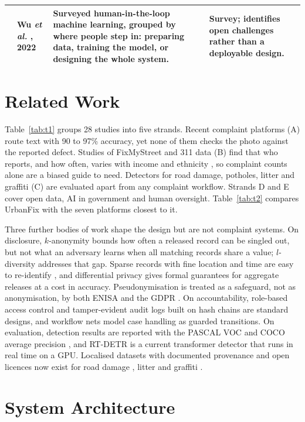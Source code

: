 \documentclass{ieeeaccess}
\begin{document}
\begin{table}[!t]
\begin{tabular}{@{}>{\centering\arraybackslash}p{}p{}p{}p{}@{}}
28 & Wu \textit{et al.} \cite{b39}, 2022 & Surveyed human-in-the-loop machine learning, grouped by where people step in: preparing data, training the model, or designing the whole system. & Survey; identifies open challenges rather than a deployable design.\\
\bottomrule
\end{tabular}
\end{table}

\section{Related Work}\label{sec:rw}

Table~\ref{tab:t1} groups 28 studies into five strands. Recent complaint platforms (A) route text with 90 to 97\% accuracy, yet none of them checks the photo against the reported defect. Studies of FixMyStreet and 311 data (B) find that who reports, and how often, varies with income and ethnicity \cite{b12,b13,b14}, so complaint counts alone are a biased guide to need. Detectors for road damage, potholes, litter and graffiti (C) are evaluated apart from any complaint workflow. Strands D and E cover open data, AI in government and human oversight. Table~\ref{tab:t2} compares UrbanFix with the seven platforms closest to it.

Three further bodies of work shape the design but are not complaint systems. On disclosure, $k$-anonymity \cite{b37} bounds how often a released record can be singled out, but not what an adversary learns when all matching records share a value; $l$-diversity \cite{b41} addresses that gap. Sparse records with fine location and time are easy to re-identify \cite{b43,b44,b45}, and differential privacy \cite{b42,b51} gives formal guarantees for aggregate releases at a cost in accuracy. Pseudonymisation is treated as a safeguard, not as anonymisation, by both ENISA \cite{b46} and the GDPR \cite{b47}. On accountability, role-based access control \cite{b49} and tamper-evident audit logs built on hash chains \cite{b50,b52} are standard designs, and workflow nets \cite{b53} model case handling as guarded transitions. On evaluation, detection results are reported with the PASCAL VOC and COCO average precision \cite{b54,b55}, and RT-DETR \cite{b56} is a current transformer detector that runs in real time on a GPU. Localised datasets with documented provenance and open licences now exist for road damage \cite{b15}, litter \cite{b17} and graffiti \cite{b19}.

\section{System Architecture}\label{sec:arch}
\end{document}
